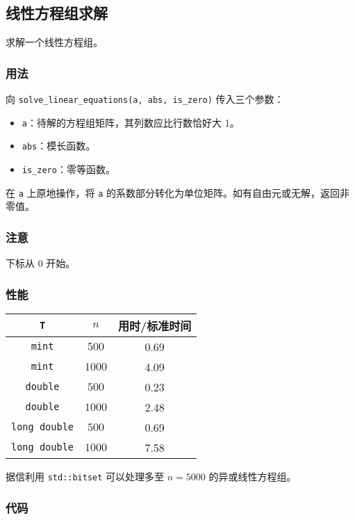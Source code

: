 \subsection{线性方程组求解}

求解一个线性方程组。

\subsubsection{用法}

向 \lstinline{solve_linear_equations(a, abs, is_zero)} 传入三个参数：
\begin{itemize}
\item \lstinline{a}：待解的方程组矩阵，其列数应比行数恰好大 1。
\item \lstinline{abs}：模长函数。
\item \lstinline{is_zero}：零等函数。
\end{itemize}

在 \lstinline{a} 上原地操作，将 \lstinline{a} 的系数部分转化为单位矩阵。如有自由元或无解，返回非零值。

\subsubsection{注意}

下标从 0 开始。

\subsubsection{性能}

\begin{tabular}{|c|c|c|}
\hline
\lstinline|T| & $n$ & 用时/标准时间 \\
\hline
\lstinline|mint| & $500$ & 0.69 \\
\hline
\lstinline|mint| & $1000$ & 4.09 \\
\hline
\lstinline|double| & $500$ & 0.23 \\
\hline
\lstinline|double| & $1000$ & 2.48 \\
\hline
\lstinline|long double| & $500$ & 0.69 \\
\hline
\lstinline|long double| & $1000$ & 7.58 \\
\hline
\end{tabular}

据信利用 \lstinline{std::bitset} 可以处理多至 $n = 5000$ 的异或线性方程组。

\subsubsection{代码}


